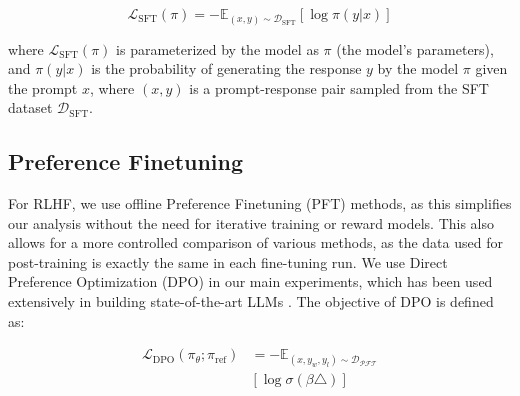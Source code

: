 \begin{equation*}
\mathcal{L}_{\text{SFT}}(\pi) = - \mathbb{E}_{(x, y) \sim \mathcal{D}_{\text{SFT}}} \left[ \log \pi(y | x) \right]
\end{equation*}

\noindent
where $\mathcal{L}_{\text{SFT}}(\pi)$ is parameterized by the model as $\pi$ (the model's parameters), and ${\pi}(y | x)$ is the probability of generating the response $y$ by the model $\pi$ given the prompt $x$, where $(x, y)$ is a prompt-response pair sampled from the SFT dataset $\mathcal{D}_{\text{SFT}}$. 

\subsection{Preference Finetuning}

\label{rlhf}

For RLHF, we use offline Preference Finetuning (PFT) methods, as this simplifies our analysis without the need for iterative training or reward models.  This also allows for a more controlled comparison of various methods, as the data used for post-training is exactly the same in each fine-tuning run.  We use Direct Preference Optimization (DPO) \citep{rafailov2024direct} in our main experiments, which has been used extensively in building state-of-the-art LLMs \cite{dubey2024llama, lambert2025tulu3pushingfrontiers}. The objective of DPO is defined as: 


\vspace{-4mm}

\begin{equation*}
\begin{split}
\mathcal{L}_{\text{DPO}}(\pi_{\theta}; \pi_{\text{ref}}) &= - \mathbb{E}_{(x, y_w, y_l) \sim \mathcal{D_\text{PFT}}} \\
&\left[ \log \sigma \left( \beta \triangle \right) \right]
 \end{split}
\end{equation*}

